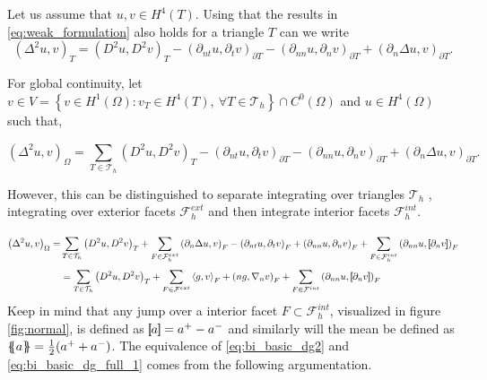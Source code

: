  Let us assume that $u,v \in
H^{4}\left( T  \right) $. Using that the results in \eqref{eq:weak_formulation} also holds for a triangle $T$ can we write
\begin{equation}
\label{eq:bi_basic_dg}
\left( \Delta  ^{2} u,v \right) _{T} =  \left( D^2u,D^2v \right) _{T } - \left(\partial _{nt} u, \partial _{t}v
\right)_{\partial T} - \left(\partial _{nn} u, \partial _{n}v \right)_{\partial T} + \left(\partial _{n} \Delta  u,v
\right)_{\partial T}
.\end{equation}

For global continuity, let  $v \in V =  \left\{ v \in H^{1}\left( \Omega  \right): v_{T} \in  H^{4}\left( T \right), \ \forall T \in
\mathcal{T}_{h}    \right\}   \cap C^{0} (
\Omega  ) $ and $u \in  H^{4}\left( \Omega  \right) $ such that,

\begin{equation}
\label{eq:bi_basic_dg2}
\left( \Delta  ^{2} u,v \right) _{\Omega } = \sum_{T \in  \mathcal{T} _{h}}^{}  \left( D^2u,D^2v \right) _{T } - \left(\partial _{nt} u, \partial _{t}v
\right)_{\partial T} - \left(\partial _{nn} u, \partial _{n}v \right)_{\partial T} + \left(\partial _{n} \Delta  u,v
\right)_{\partial T}.
\end{equation}

However, this can be distinguished to separate integrating over triangles $\mathcal{T} _{h}$ , integrating over exterior facets $\mathcal{F} _{h}^{ext}$ and then integrate interior facets $\mathcal{F} _{h}^{int}$.

\begin{equation}
\label{eq:bi_basic_dg_full_1}
\begin{split}
\left( \Delta  ^{2} u, v \right) _{\Omega } =& \sum_{T \in  \mathcal{T} _{h}}^{} \left( D^2u, D^2v \right)_{T}  + \sum_{F \in \mathcal{F}_{h}^{ext}}  \left(\partial _{n} \Delta u, v  \right) _{F}
- \left(\partial _{nt} u, \partial _{t} v \right) _{F}+
\left( \partial _{nn} u, \partial _{n} v \right)_{F} + \sum_{F \in \mathcal{F}_{h}  ^{int}}^{} \left(\partial _{nn} u , \jump{ \partial _{n} v }
\right)_{F} \\
& = \sum_{T \in  \mathcal{T} _{h}}^{} \left( D^2u, D^2v \right)_{T} + \sum_{F \in
\mathcal{F} ^{ext}_{}}^{} \left<g, v  \right> _{F}
+ \left(n g, \nabla _{n}v \right)_{F}  + \sum_{F \in \mathcal{F}  ^{int}}^{} \left( \partial _{nn} u , \jump{ \partial_{n} v } \right)_{F}
\end{split}
\end{equation}
Keep in mind that any jump over a interior facet $F \subset \mathcal{F} _{h}^{int}   $, visualized in figure \ref{fig:normal}, is defined as $\left[\!\!\left[  a  \right]\!\!\right] =    a^{+} - a^{-} $
and similarly will the mean be defined as $\left\{\!\!\left\{ a  \right\}\!\!\right\} = \frac{1}{2}(   a^{+}
+ a^{-})$.    The equivalence of \eqref{eq:bi_basic_dg2} and \eqref{eq:bi_basic_dg_full_1} comes from the following argumentation.

